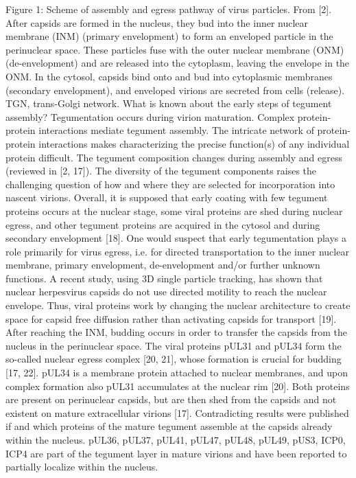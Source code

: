 Figure 1: Scheme of assembly and egress pathway of virus particles.
From [2].
After capsids are formed in the nucleus, they bud into the inner nuclear membrane (INM) (primary envelopment) to form an enveloped particle in the perinuclear space.
These particles fuse with the outer nuclear membrane (ONM) (de-envelopment) and are released into the cytoplasm, leaving the envelope in the ONM.
In the cytosol, capsids bind onto and bud into cytoplasmic membranes (secondary envelopment), and enveloped virions are secreted from cells (release).
TGN, trans-Golgi network.
What is known about the early steps of tegument assembly?
Tegumentation occurs during virion maturation.
Complex protein-protein interactions mediate tegument assembly.
The intricate network of protein-protein interactions makes characterizing the precise function(s) of any individual protein difficult.
The tegument composition changes during assembly and egress (reviewed in [2, 17]).
The diversity of the tegument components raises the challenging question of how and where they are selected for incorporation into nascent virions.
Overall, it is supposed that early coating with few tegument proteins occurs at the nuclear stage, some viral proteins are shed during nuclear egress, and other tegument proteins are acquired in the cytosol and during secondary envelopment [18].
One would suspect that early tegumentation plays a role primarily for virus egress, i.e.
for directed transportation to the inner nuclear membrane, primary envelopment, de-envelopment and/or further unknown functions.
A recent study, using 3D single particle tracking, has shown that nuclear herpesvirus capsids do not use directed motility to reach the nuclear envelope.
Thus, viral proteins work by changing the nuclear architecture to create space for capsid free diffusion rather than activating capsids for transport [19].
After reaching the INM, budding occurs in order to transfer the capsids from the nucleus in the perinuclear space.
The viral proteins pUL31 and pUL34 form the so-called nuclear egress complex [20, 21], whose formation is crucial for budding [17, 22].
pUL34 is a membrane protein attached to nuclear membranes, and upon complex formation also pUL31 accumulates at the nuclear rim [20].
Both proteins are present on perinuclear capsids, but are then shed from the capsids and not existent on mature extracellular virions [17].
Contradicting results were published if and which proteins of the mature tegument assemble at the capsids already within the nucleus.
pUL36, pUL37, pUL41, pUL47, pUL48, pUL49, pUS3, ICP0, ICP4 are part of the tegument layer in mature virions and have been reported to partially localize within the nucleus.

